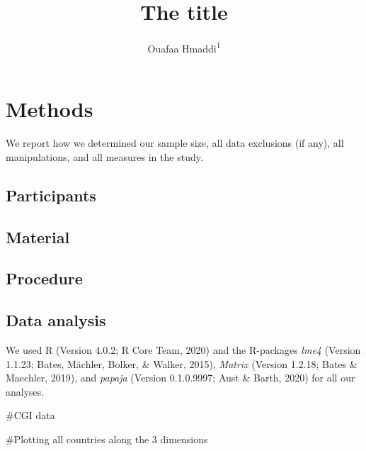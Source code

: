 \documentclass[
  english,
  man]{apa6}
\title{The title}
\author{Ouafaa Hmaddi\textsuperscript{1}}
\date{}
\affiliation{\vspace{0.5cm}\textsuperscript{1} University of Oregon}
\begin{document}
\maketitle

\hypertarget{methods}{%
\section{Methods}\label{methods}}

We report how we determined our sample size, all data exclusions (if any), all manipulations, and all measures in the study.

\hypertarget{participants}{%
\subsection{Participants}\label{participants}}

\hypertarget{material}{%
\subsection{Material}\label{material}}

\hypertarget{procedure}{%
\subsection{Procedure}\label{procedure}}

\hypertarget{data-analysis}{%
\subsection{Data analysis}\label{data-analysis}}

We used R (Version 4.0.2; R Core Team, 2020) and the R-packages \emph{lme4} (Version 1.1.23; Bates, Mächler, Bolker, \& Walker, 2015), \emph{Matrix} (Version 1.2.18; Bates \& Maechler, 2019), and \emph{papaja} (Version 0.1.0.9997; Aust \& Barth, 2020) for all our analyses.

\#CGI data

\#Plotting all countries along the 3 dimensions
\end{document}
